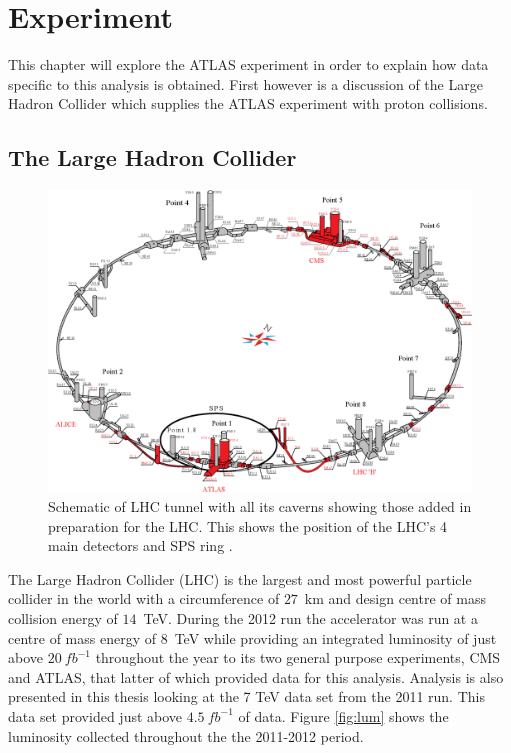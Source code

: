 \chapter{Experiment}

	This chapter will explore the ATLAS experiment in order to explain how data specific to this analysis is obtained. First however is a discussion of the Large Hadron Collider which supplies the ATLAS experiment with proton collisions.

\section{The Large Hadron Collider}

	\begin{figure}[h!]
        \begin{center}
            \includegraphics[width=0.9\linewidth]{images/LHCUnder_new.eps}
        \end{center}
        \caption{Schematic of LHC tunnel with all its caverns showing those added in preparation for the LHC. This shows the position of the LHC's 4 main detectors and SPS ring \cite{1367.2630.9.9.335}.}
        \label{fig:experimentLHC}
    \end{figure}

	The Large Hadron Collider (LHC) \cite{Bruning:782076} is the largest and most powerful particle collider in the world with a circumference of $27$~km and design centre of mass collision energy of $14$~TeV. During the 2012 run the accelerator was run at a centre of mass energy of $8$~TeV while providing an integrated luminosity of just above $20~fb^{-1}$ throughout the year to its two general purpose experiments, CMS and ATLAS, that latter of which provided data for this analysis. Analysis is also presented in this thesis looking at the 7 TeV data set from the 2011 run. This data set provided just above $4.5~fb^{-1}$ of data. Figure \ref{fig:lum} shows the luminosity collected throughout the the 2011-2012 period. 

